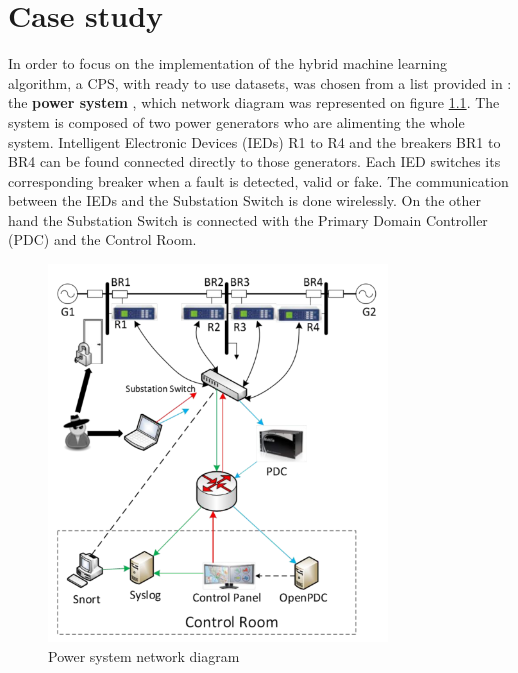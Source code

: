 \chapter{Case study}
In order to focus on the implementation of the hybrid machine learning algorithm, a CPS, with ready to use datasets, was chosen from a list provided in \cite{morris_industrial_nodate}: the \textbf{power system} \cite{adhikari_power_2014}, which network diagram was represented on figure \ref{fig:cps_rep}. The system is composed of two power generators who are alimenting the whole system. Intelligent Electronic Devices (IEDs) R1 to R4 and the breakers BR1 to BR4 can be found connected directly to those generators. Each IED switches its corresponding breaker when a fault is detected, valid or fake. The communication between the IEDs and the Substation Switch is done wirelessly. On the other hand the Substation Switch is connected with the Primary Domain Controller (PDC) and the Control Room.

\begin{figure}[H]
    \centering
    \includegraphics[width=90mm]{images/cps_rep.png}
    \caption[Power system network diagram]{Power system network diagram \cite{adhikari_power_2014}}
    \label{fig:cps_rep}
\end{figure}


